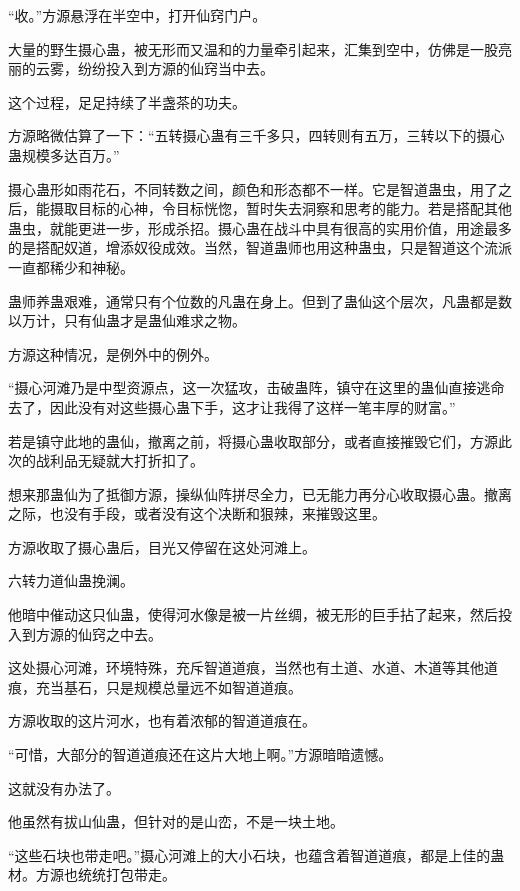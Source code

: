 
\begin{this_body}



“收。”方源悬浮在半空中，打开仙窍门户。

大量的野生摄心蛊，被无形而又温和的力量牵引起来，汇集到空中，仿佛是一股亮丽的云雾，纷纷投入到方源的仙窍当中去。

这个过程，足足持续了半盏茶的功夫。

方源略微估算了一下：“五转摄心蛊有三千多只，四转则有五万，三转以下的摄心蛊规模多达百万。”

摄心蛊形如雨花石，不同转数之间，颜色和形态都不一样。它是智道蛊虫，用了之后，能摄取目标的心神，令目标恍惚，暂时失去洞察和思考的能力。若是搭配其他蛊虫，就能更进一步，形成杀招。摄心蛊在战斗中具有很高的实用价值，用途最多的是搭配奴道，增添奴役成效。当然，智道蛊师也用这种蛊虫，只是智道这个流派一直都稀少和神秘。

蛊师养蛊艰难，通常只有个位数的凡蛊在身上。但到了蛊仙这个层次，凡蛊都是数以万计，只有仙蛊才是蛊仙难求之物。

方源这种情况，是例外中的例外。

“摄心河滩乃是中型资源点，这一次猛攻，击破蛊阵，镇守在这里的蛊仙直接逃命去了，因此没有对这些摄心蛊下手，这才让我得了这样一笔丰厚的财富。”

若是镇守此地的蛊仙，撤离之前，将摄心蛊收取部分，或者直接摧毁它们，方源此次的战利品无疑就大打折扣了。

想来那蛊仙为了抵御方源，操纵仙阵拼尽全力，已无能力再分心收取摄心蛊。撤离之际，也没有手段，或者没有这个决断和狠辣，来摧毁这里。

方源收取了摄心蛊后，目光又停留在这处河滩上。

六转力道仙蛊挽澜。

他暗中催动这只仙蛊，使得河水像是被一片丝绸，被无形的巨手拈了起来，然后投入到方源的仙窍之中去。

这处摄心河滩，环境特殊，充斥智道道痕，当然也有土道、水道、木道等其他道痕，充当基石，只是规模总量远不如智道道痕。

方源收取的这片河水，也有着浓郁的智道道痕在。

“可惜，大部分的智道道痕还在这片大地上啊。”方源暗暗遗憾。

这就没有办法了。

他虽然有拔山仙蛊，但针对的是山峦，不是一块土地。

“这些石块也带走吧。”摄心河滩上的大小石块，也蕴含着智道道痕，都是上佳的蛊材。方源也统统打包带走。


\end{this_body}
